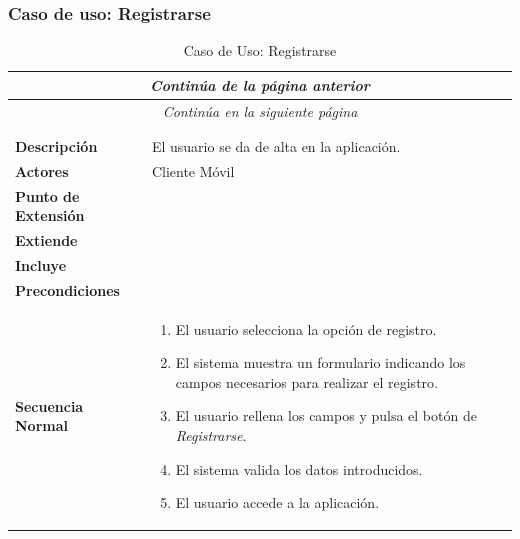 \subsubsection*{Caso de uso: Registrarse}
\begin{longtable}{| p{4cm} | p{10cm} |}
\endfirsthead
\multicolumn{2}{c}{\textit{Continúa de la página anterior}}\\[12pt]
\hline
\endhead
\hline
\multicolumn{2}{c}{\textit{Continúa en la siguiente página}} \\
\endfoot
\hline
\caption{Caso de Uso: Registrarse}\label{fig:1}\\
\endlastfoot


\hline
\multicolumn{2}{|c|}{\textbf{CU$<$02$>$ - Registrarse}} \\

\hline
\textbf{Descripción} &
El usuario se da de alta en la aplicación. \\

\hline
\textbf{Actores} &
Cliente Móvil\\

\hline
\textbf{Punto de Extensión} &
\\

\hline
\textbf{Extiende} &
\\

\hline
\textbf{Incluye} &
\\

\hline
\textbf{Precondiciones} &
\\

\hline
\textbf{Secuencia Normal} &\mbox{}\par\vspace{-\baselineskip}
\begin{enumerate}[leftmargin=0.7cm, topsep=0.1cm]
\item El usuario selecciona la opción de registro.
\item El sistema muestra un formulario indicando los campos necesarios para realizar el registro.
\item El usuario rellena los campos y pulsa el botón de \textit{Registrarse}.
\item El sistema valida los datos introducidos.
\item El usuario accede a la aplicación.
\end{enumerate}\\


\end{longtable}
